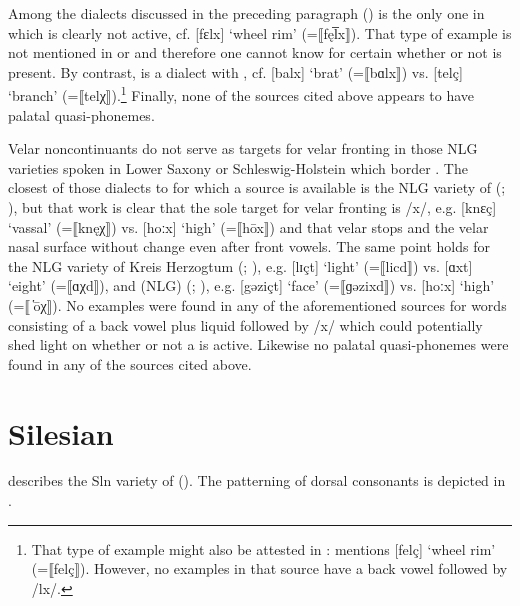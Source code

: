 Among the dialects discussed in the preceding paragraph  (\citealt{Jacobs1925a, Jacobs1925b, Jacobs1926}) is the only one in which  is clearly not active, cf. [fɛlx] ‘wheel rim’ (=⟦fęl̅x⟧). That type of example is not mentioned in \citet{Holst1907} or \citet{Dützmann1932} and therefore one cannot know for certain whether or not  is present. By contrast,  is a dialect with , cf. [balx] ‘brat’ (=⟦bɑlx⟧) vs. [telç] ‘branch’ (=⟦telχ⟧).\footnote{{That type of example might also be attested in :  \citet{GSchmidt1912} mentions [felç] ‘wheel rim’ (=⟦felç⟧). However, no examples in that source have a back vowel followed by /lx/.} } Finally, none of the sources cited above appears to have palatal quasi-phonemes.\largerpage

\begin{sloppypar}
Velar noncontinuants do not serve as targets for velar fronting in those NLG varieties spoken in Lower Saxony or Schleswig-Holstein which border . The closest of those dialects to  for which a source is available is the NLG variety of  (\citealt{Pühn1956}; ), but that work is clear that the sole target for velar fronting is /x/, e.g. [knɛç] ‘vassal’ (=⟦knęχ⟧) vs. [hoːx] ‘high’ (=⟦hōx⟧) and that velar stops and the velar nasal surface without change even after front vowels. The same point holds for the NLG variety of Kreis Herzogtum  (\citealt{Heigener1937}; ), e.g. [lɪçt] ‘light’ (=⟦licd⟧) vs. [ɑxt] ‘eight’ (=⟦ɑχd⟧), and (NLG)  (\citealt{Rabeler1911}; ), e.g. [gəziçt] ‘face’ (=⟦ɡəzixd⟧) vs. [hoːx] ‘high’ (=⟦ ̔ōχ⟧). No examples were found in any of the aforementioned sources for words consisting of a back vowel plus liquid followed by /x/ which could potentially shed light on whether or not a  is active. Likewise no palatal quasi-phonemes were found in any of the sources cited above.
\end{sloppypar}

\section{Silesian}\label{sec:11.4}

\citet{Meiche1898} describes the Sln variety of  (). The patterning of dorsal consonants is depicted in .

